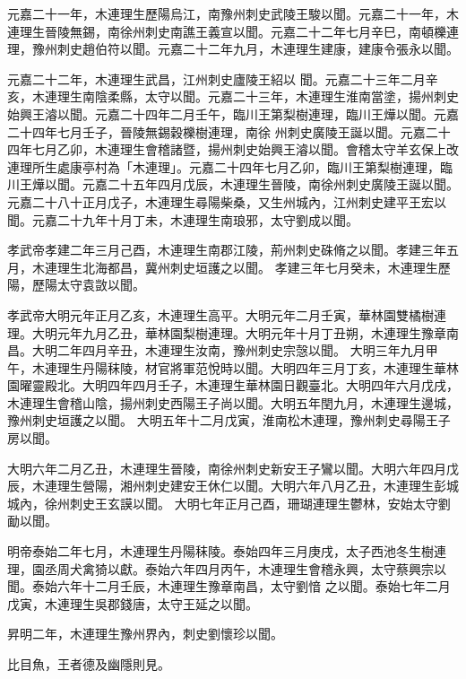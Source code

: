 \begin{pinyinscope}
 元嘉二十一年，木連理生歷陽烏江，南豫州刺史武陵王駿以聞。元嘉二十一年，木連理生晉陵無錫，南徐州刺史南譙王義宣以聞。元嘉二十二年七月辛巳，南頓櫟連理，豫州刺史趙伯符以聞。元嘉二十二年九月，木連理生建康，建康令張永以聞。



 元嘉二十二年，木連理生武昌，江州刺史廬陵王紹以
 聞。元嘉二十三年二月辛亥，木連理生南陰柔縣，太守以聞。元嘉二十三年，木連理生淮南當塗，揚州刺史始興王濬以聞。元嘉二十四年二月壬午，臨川王第梨樹連理，臨川王燁以聞。元嘉二十四年七月壬子，晉陵無錫穀櫟樹連理，南徐
 州刺史廣陵王誕以聞。元嘉二十四年七月乙卯，木連理生會稽諸暨，揚州刺史始興王濬以聞。會稽太守羊玄保上改連理所生處康亭村為「木連理」。元嘉二十四年七月乙卯，臨川王第梨樹連理，臨川王燁以聞。元嘉二十五年四月戊辰，木連理生晉陵，南徐州刺史廣陵王誕以聞。
 元嘉二十八十正月戊子，木連理生尋陽柴桑，又生州城內，江州刺史建平王宏以聞。元嘉二十九年十月丁未，木連理生南琅邪，太守劉成以聞。



 孝武帝孝建二年三月己酉，木連理生南郡江陵，荊州刺史硃脩之以聞。孝建三年五月，木連理生北海都昌，冀州刺史垣護之以聞。
 孝建三年七月癸未，木連理生歷陽，歷陽太守袁敳以聞。



 孝武帝大明元年正月乙亥，木連理生高平。大明元年二月壬寅，華林園雙橘樹連理。大明元年九月乙丑，華林園梨樹連理。大明元年十月丁丑朔，木連理生豫章南昌。大明二年四月辛丑，木連理生汝南，豫州刺史宗愨以聞。
 大明三年九月甲午，木連理生丹陽秣陵，材官將軍范悅時以聞。大明四年三月丁亥，木連理生華林園曜靈殿北。大明四年四月壬子，木連理生華林園日觀臺北。大明四年六月戊戌，木連理生會稽山陰，揚州刺史西陽王子尚以聞。大明五年閏九月，木連理生邊城，豫州刺史垣護之以聞。
 大明五年十二月戊寅，淮南松木連理，豫州刺史尋陽王子房以聞。



 大明六年二月乙丑，木連理生晉陵，南徐州刺史新安王子鸞以聞。大明六年四月戊辰，木連理生營陽，湘州刺史建安王休仁以聞。大明六年八月乙丑，木連理生彭城城內，徐州刺史王玄謨以聞。
 大明七年正月己酉，珊瑚連理生鬱林，安始太守劉勔以聞。



 明帝泰始二年七月，木連理生丹陽秣陵。泰始四年三月庚戌，太子西池冬生樹連理，園丞周犬禽猗以獻。泰始六年四月丙午，木連理生會稽永興，太守蔡興宗以聞。泰始六年十二月壬辰，木連理生豫章南昌，太守劉愔
 之以聞。泰始七年二月戊寅，木連理生吳郡錢唐，太守王延之以聞。



 昇明二年，木連理生豫州界內，刺史劉懷珍以聞。


比目魚，王者德及幽隱則見。



\end{pinyinscope}
